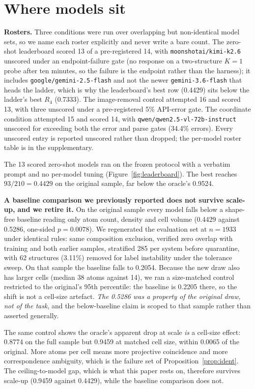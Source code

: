 \section{Where models sit}
\label{sec:models}

\textbf{Rosters.} Three conditions were run over overlapping but non-identical model sets, so we name each
roster explicitly and never write a bare count. The zero-shot leaderboard scored 13 of a pre-registered 14,
with \texttt{moonshotai/kimi-k2.6} unscored under an endpoint-failure gate (no response on a two-structure
$K{=}1$ probe after ten minutes, so the failure is the endpoint rather than the harness); it includes
\texttt{google/gemini-2.5-flash} and not the newer \texttt{gemini-3.6-flash} that heads the ladder, which
is why the leaderboard's best row (0.4429) sits below the ladder's best $R_4$ (0.7333). The image-removal
control attempted 16 and scored 13, with three unscored under a pre-registered 5\% API-error gate. The
coordinate condition attempted 15 and scored 14, with \texttt{qwen/qwen2.5-vl-72b-instruct} unscored for
exceeding both the error and parse gates (34.4\% errors). Every unscored entry is reported unscored rather
than dropped; the per-model roster table is in the supplementary.

The 13 scored zero-shot models ran on the frozen protocol with a verbatim prompt and no per-model tuning
(Figure~\ref{fig:leaderboard}). The best reaches $93/210 = 0.4429$ on the original sample, far below the
oracle's 0.9524.

\textbf{A baseline comparison we previously reported does not survive scale-up, and we retire it.} On the
original sample every model falls below a shape-free baseline reading only atom count, density and cell
volume (0.4429 against 0.5286, one-sided $p = 0.0078$). We regenerated the evaluation set at $n = 1933$
under identical rules: same composition exclusion, verified zero overlap with training and both earlier
samples, stratified 285 per system before quarantine, with 62 structures (3.11\%) removed for label
instability under the tolerance sweep. On that sample the baseline falls to 0.2054. Because the new draw
also has larger cells (median 38 atoms against 14), we ran a size-matched control restricted to the
original's 95th percentile: the baseline is 0.2205 there, so the shift is not a cell-size artefact.
\emph{The 0.5286 was a property of the original draw, not of the task}, and the below-baseline claim is
scoped to that sample rather than asserted generally.

The same control shows the oracle's apparent drop at scale \emph{is} a cell-size effect: 0.8774 on the full
sample but 0.9459 at matched cell size, within 0.0065 of the original. More atoms per cell means more
projective coincidence and more correspondence ambiguity, which is the failure set of
Proposition~\ref{prop:ident}. The ceiling-to-model gap, which is what this paper rests on, therefore
survives scale-up (0.9459 against 0.4429), while the baseline comparison does not.

